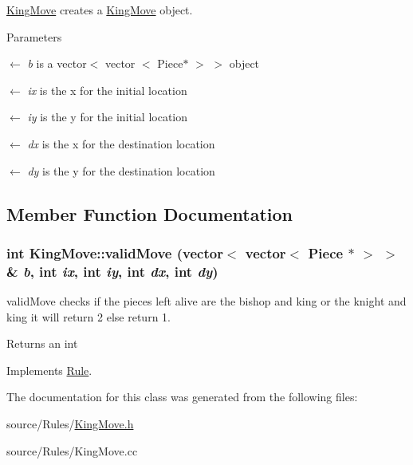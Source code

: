 \hyperlink{classKingMove}{KingMove} creates a \hyperlink{classKingMove}{KingMove} object. 
\begin{DoxyParams}{Parameters}
\item[\mbox{$\leftarrow$} {\em b}]is a vector$<$ vector $<$ Piece$\ast$ $>$ $>$ object \item[\mbox{$\leftarrow$} {\em ix}]is the x for the initial location \item[\mbox{$\leftarrow$} {\em iy}]is the y for the initial location \item[\mbox{$\leftarrow$} {\em dx}]is the x for the destination location \item[\mbox{$\leftarrow$} {\em dy}]is the y for the destination location \end{DoxyParams}


\subsection{Member Function Documentation}
\hypertarget{classKingMove_a2c3086623fc47b43cef95ba6ee95915b}{
\subsubsection[{validMove}]{\setlength{\rightskip}{0pt plus 5cm}int KingMove::validMove (vector$<$ vector$<$ {\bf Piece} $\ast$ $>$ $>$ \& {\em b}, \/  int {\em ix}, \/  int {\em iy}, \/  int {\em dx}, \/  int {\em dy})}}
\label{classKingMove_a2c3086623fc47b43cef95ba6ee95915b}


validMove checks if the pieces left alive are the bishop and king or the knight and king it will return 2 else return 1. \begin{DoxyReturn}{Returns}
an int 
\end{DoxyReturn}


Implements \hyperlink{classRule}{Rule}.

The documentation for this class was generated from the following files:\begin{DoxyCompactItemize}
\item 
source/Rules/\hyperlink{KingMove_8h}{KingMove.h}\item 
source/Rules/KingMove.cc\end{DoxyCompactItemize}
